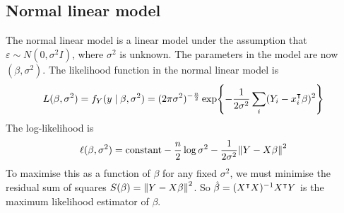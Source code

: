 \subsection{Normal linear model}
The normal linear model is a linear model under the assumption that \( \varepsilon \sim N(0,\sigma^2 I) \), where \( \sigma^2 \) is unknown.
The parameters in the model are now \( (\beta, \sigma^2) \).
The likelihood function in the normal linear model is
\[ L(\beta, \sigma^2) = f_Y(y\mid \beta,\sigma^2) = (2\pi \sigma^2)^{-\frac{n}{2}} \exp{-\frac{1}{2\sigma^2} \sum_i (Y_i - x_i^\intercal\beta)^2} \]
The log-likelihood is
\[ \ell(\beta,\sigma^2) = \text{constant} - \frac{n}{2}\log \sigma^2 - \frac{1}{2\sigma^2} \norm{Y-X\beta}^2 \]
To maximise this as a function of \( \beta \) for any fixed \( \sigma^2 \), we must minimise the residual sum of squares \( S(\beta) = \norm{Y-X\beta}^2 \).
So \( \hat \beta = (X^\intercal X)^{-1} X^\intercal Y \) is the maximum likelihood estimator of \( \beta \).

